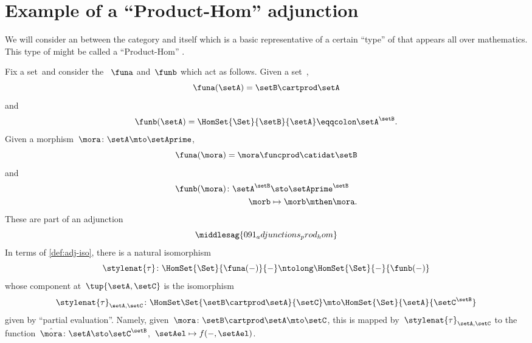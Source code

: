 
\section[Product-Hom adjunction]{Example of a ``Product-Hom'' adjunction}
We will consider an  between the category \Set and itself which is a basic representative of a certain ``type'' of  that appears all over mathematics.
This type of  might be called a ``Product-Hom'' .

Fix a set~\setB and consider the ~$\funa$ and~$\funb$ which act as follows.
Given a set~\setA,
\begin{equation}
    \funa(\setA) = \setB \cartprod \setA
\end{equation}
and
\begin{equation}
    \funb(\setA) = \HomSet{\Set}{\setB}{\setA} \eqqcolon \setA^\setB.
\end{equation}
Given a morphism~$\mora\colon \setA \mto \setAprime$,
\begin{equation}
    \funa(\mora) = \mora \funcprod \catidat\setB
\end{equation}
and
\begin{equation}
    \begin{aligned}
        \funb(\mora)\colon \setA^\setB & \sto \setAprime^\setB \\
        \morb                          & \mapsto \morb \mthen \mora.
    \end{aligned}
\end{equation}
%
These  are part of an adjunction
%
\begin{equation}
    \middlesag{091_adjunctions_prod_hom}
\end{equation}
In terms of \cref{def:adj-iso}, there is a natural isomorphism
\begin{equation}
    \stylenat{\tau}\colon \HomSet{\Set}{\funa(- )}{-} \ntolong \HomSet{\Set}{-}{\funb( - )}
\end{equation}
whose component at~$\tup{\setA,\setC}$ is the isomorphism
\begin{equation}
    \stylenat{\tau}_{\setA,\setC} \colon \HomSet\Set{\setB\cartprod \setA}{\setC} \mto \HomSet{\Set}{\setA}{\setC^\setB}
\end{equation}
given by ``partial evaluation''.
Namely, given~$\mora \colon \setB \cartprod \setA \mto \setC$, this is mapped by~$\stylenat{\tau}_{\setA,\setC}$ to the function~$\hat \mora \colon \setA \sto \setC^\setB$,~$\setAel \mapsto f( -, \setAel)$.

